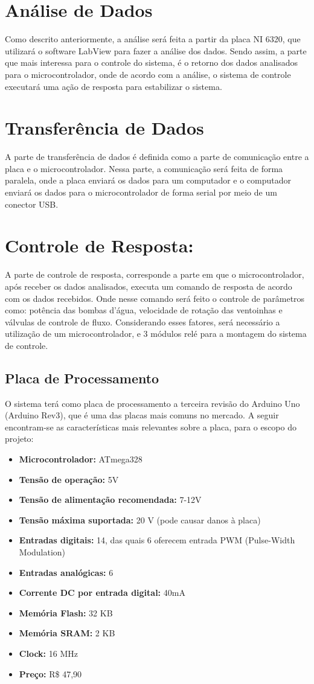 \section{Análise de Dados}
Como descrito anteriormente, a análise será feita a partir da placa NI 6320, que utilizará o software LabView para fazer a análise dos dados. Sendo assim, a parte que mais interessa para o controle do sistema, é o retorno dos dados analisados para o microcontrolador, onde de acordo com a análise, o sistema de controle executará uma ação de resposta para estabilizar o sistema.
\section{Transferência de Dados}
A parte de transferência de dados é definida como a parte de comunicação entre a placa e o microcontrolador. Nessa parte, a comunicação será feita de forma paralela, onde a placa enviará os dados para um computador e o computador enviará os dados para o microcontrolador de forma serial por meio de um conector USB.
\section{Controle de Resposta:}
A parte de controle de resposta, corresponde a parte em que o microcontrolador, após receber os dados analisados, executa um comando de resposta de acordo com os dados recebidos. Onde nesse comando será feito o controle de parâmetros como: potência das bombas d'água, velocidade de rotação das ventoinhas e válvulas de controle de fluxo.
Considerando esses fatores, será necessário a utilização de um microcontrolador, e 3 módulos relé para a montagem do sistema de controle.

\subsection{Placa de Processamento}
O sistema terá como placa de processamento a terceira revisão do Arduino Uno (Arduino Rev3), que é uma das placas mais comuns no mercado. A seguir encontram-se as características mais relevantes sobre a placa, para o escopo do projeto:
\begin{itemize}
	\item \textbf{Microcontrolador:} ATmega328
	\item \textbf{Tensão de operação:} 5V
	\item \textbf{Tensão de alimentação recomendada:} 7-12V
	\item \textbf{Tensão máxima suportada:} 20 V (pode causar danos à placa)
	\item \textbf{Entradas digitais:} 14, das quais 6 oferecem entrada PWM (Pulse-Width Modulation)
	\item \textbf{Entradas analógicas:} 6
	\item \textbf{Corrente DC por entrada digital:} 40mA
	\item \textbf{Memória Flash:} 32 KB
	\item \textbf{Memória SRAM:} 2 KB
	\item \textbf{Clock:} 16 MHz
	\item \textbf{Preço:} R\$ 47,90
	
\end{itemize}
